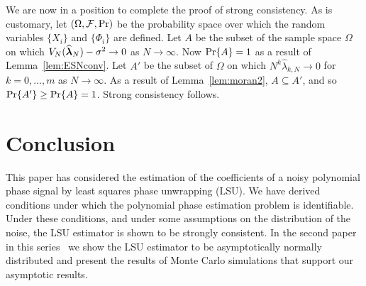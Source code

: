 \documentclass[journal]{IEEEtran}
\begin{document}
We are now in a position to complete the proof of strong consistency.  As is customary, let $(\Omega, \mathcal F, \operatorname{Pr})$ be the probability space over which the random variables $\{X_i\}$ and $\{\Phi_i\}$ are defined.  Let $A$ be the subset of the sample space $\Omega$ on which  $V_N(\widehat{\boldsymbol{\lambda}}_N) - \sigma^2 \rightarrow 0$ as $N\rightarrow\infty$.  Now $\operatorname{Pr}\{A\} =1$ as a result of Lemma~\ref{lem:ESNconv}.  Let $A'$ be the subset of $\Omega$ on which $N^k\widehat{\lambda}_{k,N} \rightarrow 0$ for $k=0,\dots,m$ as $N\rightarrow\infty$.  As a result of Lemma~\ref{lem:moran2}, $A \subseteq A'$, and so $\operatorname{Pr}\{A'\} \geq \operatorname{Pr}\{A\} = 1$.  Strong consistency follows.




 
\section{Conclusion} \label{sec:conclusion}
 
This paper has considered the estimation of the coefficients of a noisy polynomial phase signal by least squares phase unwrapping (LSU). We have derived conditions under which the polynomial phase estimation problem is identifiable.  Under these conditions, and under some assumptions on the distribution of the noise, the LSU estimator is shown to be strongly consistent. %
In the second paper in this series~\cite{McKilliam_pps2_2012} we show the LSU estimator to be asymptotically normally distributed and present the results of Monte Carlo simulations that support our asymptotic results.
  


 
 
\end{document}
